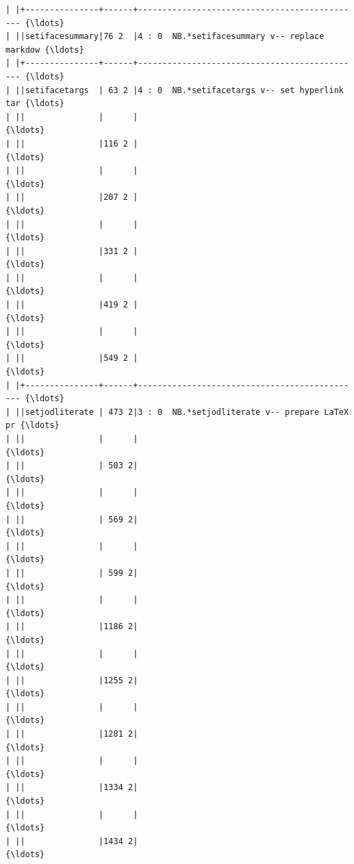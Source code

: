 \documentclass[11pt,letter,landscape]{article}
\begin{document}
\begin{Verbatim}[commandchars=\\\{\}]
| |+---------------+------+---------------------------------------------- {\ldots}
| ||setifacesummary|76 2  |4 : 0  NB.*setifacesummary v-- replace markdow {\ldots}
| |+---------------+------+---------------------------------------------- {\ldots}
| ||setifacetargs  | 63 2 |4 : 0  NB.*setifacetargs v-- set hyperlink tar {\ldots}
| ||               |      |                                               {\ldots}
| ||               |116 2 |                                               {\ldots}
| ||               |      |                                               {\ldots}
| ||               |207 2 |                                               {\ldots}
| ||               |      |                                               {\ldots}
| ||               |331 2 |                                               {\ldots}
| ||               |      |                                               {\ldots}
| ||               |419 2 |                                               {\ldots}
| ||               |      |                                               {\ldots}
| ||               |549 2 |                                               {\ldots}
| |+---------------+------+---------------------------------------------- {\ldots}
| ||setjodliterate | 473 2|3 : 0  NB.*setjodliterate v-- prepare LaTeX pr {\ldots}
| ||               |      |                                               {\ldots}
| ||               | 503 2|                                               {\ldots}
| ||               |      |                                               {\ldots}
| ||               | 569 2|                                               {\ldots}
| ||               |      |                                               {\ldots}
| ||               | 599 2|                                               {\ldots}
| ||               |      |                                               {\ldots}
| ||               |1186 2|                                               {\ldots}
| ||               |      |                                               {\ldots}
| ||               |1255 2|                                               {\ldots}
| ||               |      |                                               {\ldots}
| ||               |1281 2|                                               {\ldots}
| ||               |      |                                               {\ldots}
| ||               |1334 2|                                               {\ldots}
| ||               |      |                                               {\ldots}
| ||               |1434 2|                                               {\ldots}

\end{Verbatim}
\end{document}
